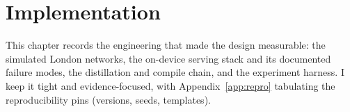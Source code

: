 \chapter{Implementation}\label{ch:implementation}

This chapter records the engineering that made the design measurable: the
simulated London networks, the on-device serving stack and its documented
failure modes, the distillation and compile chain, and the experiment
harness. I keep it tight and evidence-focused, with
Appendix~\ref{app:repro} tabulating the reproducibility pins (versions,
seeds, templates).







